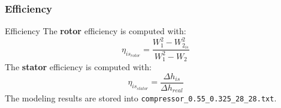 \subsubsection{Efficiency}
	\begin{frame}[fragile]{Efficiency}
		The \textbf{rotor} efficiency is computed with:
		\begin{equation}
			\eta_{is_{rotor}} = \frac{W_1^2 - W_{2_{is}}^2}{W_1^2 - W_{2}} \nonumber 
		\end{equation}
		The \textbf{stator} efficiency is computed with:
		\begin{equation}
			\eta_{is_{stator}} = \frac{\Delta h_{is}}{\Delta h_{real}}
			\nonumber 
		\end{equation}
		The modeling results are stored into \verb|compressor_0.55_0.325_28_28.txt|.
	\end{frame}

